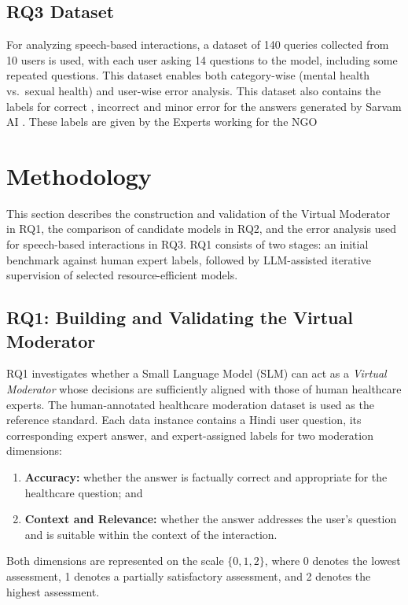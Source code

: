 \documentclass[11pt,a4paper]{article}
\begin{document}
\subsection{RQ3 Dataset}
For analyzing speech-based interactions, a dataset of 140 queries collected from 10 users is used, with each user asking 14 questions to the model, including some repeated questions. This dataset enables both category-wise (mental health vs.\ sexual health) and user-wise error analysis.
This dataset also contains the labels for correct , incorrect and minor error for the answers generated by Sarvam AI . These labels are given by the Experts working for the NGO 

\section{Methodology}
\label{sec:methodology}

This section describes the construction and validation of the Virtual Moderator
in RQ1, the comparison of candidate models in RQ2, and the error analysis used
for speech-based interactions in RQ3. RQ1 consists of two stages: an initial
benchmark against human expert labels, followed by LLM-assisted iterative
supervision of selected resource-efficient models.

\subsection{RQ1: Building and Validating the Virtual Moderator}
\label{subsec:rq1}

RQ1 investigates whether a Small Language Model (SLM) can act as a
\emph{Virtual Moderator} whose decisions are sufficiently aligned with those
of human healthcare experts. The human-annotated healthcare moderation dataset
is used as the reference standard. Each data instance contains a Hindi user
question, its corresponding expert answer, and expert-assigned labels for two
moderation dimensions:

\begin{enumerate}[nosep]
    \item \textbf{Accuracy:} whether the answer is factually correct and
    appropriate for the healthcare question; and
    \item \textbf{Context and Relevance:} whether the answer addresses the
    user's question and is suitable within the context of the interaction.
    
\end{enumerate}          
Both dimensions are represented on the scale $\{0,1,2\}$, where 0 denotes
the lowest assessment, 1 denotes a partially satisfactory assessment, and 2
denotes the highest assessment.
\end{document}
